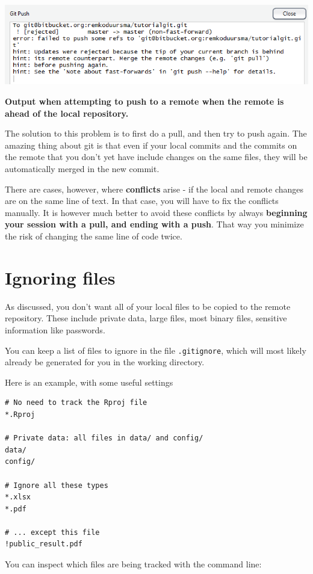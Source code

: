 \documentclass[]{book}
\begin{document}
\includegraphics[width=0.75\linewidth]{screenshots/session2pushbehind}

\textbf{Output when attempting to push to a remote when the remote is ahead of the local repository.}

The solution to this problem is to first do a pull, and then try to push again. The amazing thing about git is that even if your local commits and the commits on the remote that you don't yet have include changes on the same files, they will be automatically merged in the new commit.

There are cases, however, where \textbf{conflicts} arise - if the local and remote changes are on the same line of text. In that case, you will have to fix the conflicts manually. It is however much better to avoid these conflicts by always \textbf{beginning your session with a pull, and ending with a push}. That way you minimize the risk of changing the same line of code twice.

\hypertarget{gitignore}{%
\section{Ignoring files}\label{gitignore}}

As discussed, you don't want all of your local files to be copied to the remote repository. These include private data, large files, most binary files, sensitive information like passwords.

You can keep a list of files to ignore in the file \texttt{.gitignore}, which will most likely already be generated for you in the working directory.

Here is an example, with some useful settings

\begin{verbatim}
# No need to track the Rproj file
*.Rproj

# Private data: all files in data/ and config/
data/
config/

# Ignore all these types
*.xlsx
*.pdf

# ... except this file
!public_result.pdf
\end{verbatim}

You can inspect which files are being tracked with the command line:
\end{document}
